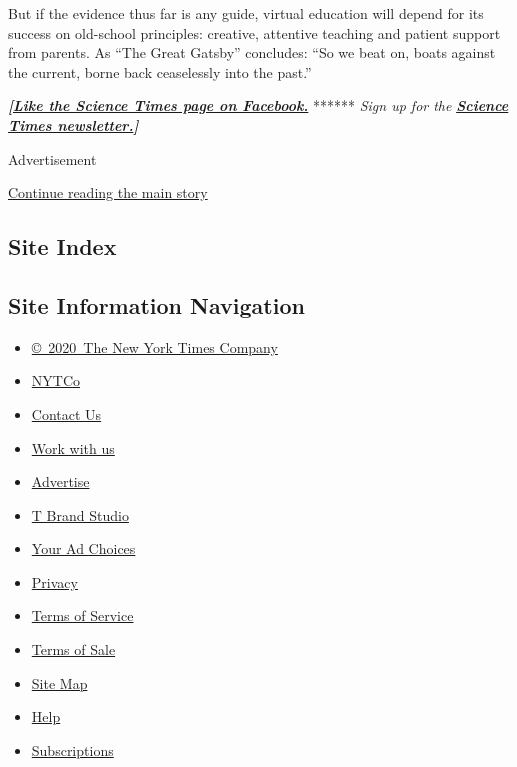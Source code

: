 But if the evidence thus far is any guide, virtual education will depend
for its success on old-school principles: creative, attentive teaching
and patient support from parents. As ``The Great Gatsby'' concludes:
``So we beat on, boats against the current, borne back ceaselessly into
the past.''

\textbf{\emph{{[}}\href{http://on.fb.me/1paTQ1h}{\emph{Like the Science
Times page on Facebook.}}} ****** \emph{\textbar{} Sign up for the}
\textbf{\href{http://nyti.ms/1MbHaRU}{\emph{Science Times
newsletter.}}\emph{{]}}}

Advertisement

\protect\hyperlink{after-bottom}{Continue reading the main story}

\hypertarget{site-index}{%
\subsection{Site Index}\label{site-index}}

\hypertarget{site-information-navigation}{%
\subsection{Site Information
Navigation}\label{site-information-navigation}}

\begin{itemize}
\tightlist
\item
  \href{https://help.nytimes.com/hc/en-us/articles/115014792127-Copyright-notice}{©~2020~The
  New York Times Company}
\end{itemize}

\begin{itemize}
\tightlist
\item
  \href{https://www.nytco.com/}{NYTCo}
\item
  \href{https://help.nytimes.com/hc/en-us/articles/115015385887-Contact-Us}{Contact
  Us}
\item
  \href{https://www.nytco.com/careers/}{Work with us}
\item
  \href{https://nytmediakit.com/}{Advertise}
\item
  \href{http://www.tbrandstudio.com/}{T Brand Studio}
\item
  \href{https://www.nytimes.com/privacy/cookie-policy\#how-do-i-manage-trackers}{Your
  Ad Choices}
\item
  \href{https://www.nytimes.com/privacy}{Privacy}
\item
  \href{https://help.nytimes.com/hc/en-us/articles/115014893428-Terms-of-service}{Terms
  of Service}
\item
  \href{https://help.nytimes.com/hc/en-us/articles/115014893968-Terms-of-sale}{Terms
  of Sale}
\item
  \href{https://spiderbites.nytimes.com}{Site Map}
\item
  \href{https://help.nytimes.com/hc/en-us}{Help}
\item
  \href{https://www.nytimes.com/subscription?campaignId=37WXW}{Subscriptions}
\end{itemize}
